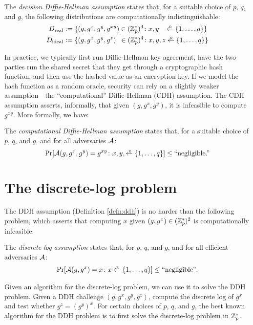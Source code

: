 \begin{definition}\label{defn:ddh}
The \emph{decision Diffie-Hellman assumption} states that,
for a suitable choice of $p$, $q$, and $g$, the following distributions are 
computationally indistinguishable:
  \begin{align*}
    D_\text{real} &\deq \{ (g, g^x, g^y, g^{xy}) \in (\Z^*_p)^4\colon x, y \,\,\,\,\,\getsr \{1, \dots, q\}\}\\
    D_\text{ideal} &\deq \{ (g, g^x, g^y, g^z) \,\,\,\in (\Z^*_p)^4 \colon x, y, z \getsr \{1, \dots, q\}\}
  \end{align*}
\end{definition}

In practice, we typically first run Diffie-Hellman key
agreement, have the two parties run the
shared secret that they get through a cryptographic hash function, 
and then use the hashed value as an encryption key.
If we model the hash function as a random oracle, security can rely
on a slightly weaker assumption---the ``computational'' Diffie-Hellman
(CDH) assumption.
The CDH assumption asserts, informally, that given $(g, g^x, g^y)$, it is
infeasible to compute $g^{xy}$. More formally, we have:

\begin{definition}\label{defn:cdh}
The \emph{computational Diffie-Hellman assumption} states that,
for a suitable choice of $p$, $q$, and $g$, and for all adversaries $\mathcal{A}$:
\[ \Pr[\calA(g, g^x, g^y) = g^{xy} \colon x, y, \getsr\{1, \dots, q\} ] \leq \text{``negligible.''}\]
\end{definition}


\section{The discrete-log problem}
The DDH assumption (Definition \ref{defn:ddh}) is no harder than the following
problem, which asserts that computing $x$ given $(g, g^x) \in (\mathbb{Z}_p^*)^2$
is computationally infeasible:
\begin{definition}
The \emph{discrete-log assumption} states that,
for $p$, $q$, and $g$, and for all efficient 
adversaries $\mathcal{A}$:
  \[ \Pr[\calA(g, g^x) = x \colon x \getsr \{1, \dots, q\} ] \leq \text{``negligible''}.\]
\end{definition}
Given an algorithm for the discrete-log problem, we can use it to solve the DDH problem.
Given a DDH challenge $(g, g^x, g^y, g^{z})$, compute the discrete log of $g^x$ and
test whether $g^z = {(g^y)}^x$.
For certain choices of $p$, $q$, and $g$, the best known algorithm for the DDH problem
is to first solve the discrete-log problem in $\mathbb{Z}^*_p$.

